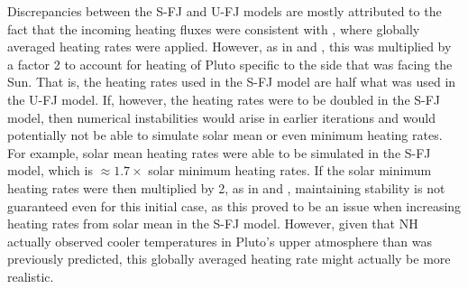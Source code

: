\documentclass[times,12]{article}
\begin{document}
\indent Discrepancies between the S-FJ and U-FJ models are mostly attributed to the fact that the incoming heating fluxes were consistent with \cite{Krasnopolsky1999}, where globally averaged heating rates were applied. However, as in \cite{Strobel2008} and \cite{Erwin2013}, this was multiplied by a factor 2 to account for heating of Pluto specific to the side that was facing the Sun. That is, the heating rates used in the S-FJ model are half what was used in the U-FJ model. If, however, the heating rates were to be doubled in the S-FJ model, then numerical instabilities would arise in earlier iterations and would potentially not be able to simulate solar mean or even minimum heating rates. For example, solar mean heating rates were able to be simulated in the S-FJ model, which is $\approx 1.7 \times$ solar minimum heating rates. If the solar minimum heating rates were then multiplied by 2, as in \cite{Strobel2008} and \cite{Erwin2013}, maintaining stability is not guaranteed even for this initial case, as this proved to be an issue when increasing heating rates from solar mean in the S-FJ model. However, given that NH actually observed cooler temperatures in Pluto's upper atmosphere than was previously predicted, this globally averaged heating rate might actually be more realistic.\\
\end{document}
